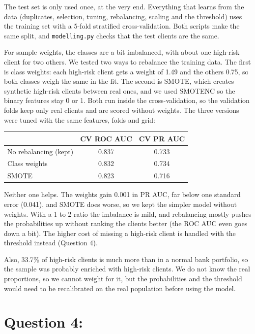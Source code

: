 \documentclass[12pt]{article}
\renewcommand{\_}{\textunderscore\allowbreak}
\begin{document}
The test set is only used once, at the very end. Everything that learns from the data (duplicates, selection, tuning, rebalancing, scaling and the threshold) uses the training set with a 5-fold stratified cross-validation. Both scripts make the same split, and \texttt{modelling.py} checks that the test clients are the same.

For sample weights, the classes are a bit imbalanced, with about one high-risk client for two others. We tested two ways to rebalance the training data. The first is class weights: each high-risk client gets a weight of 1.49 and the others 0.75, so both classes weigh the same in the fit. The second is SMOTE, which creates synthetic high-risk clients between real ones, and we used SMOTENC so the binary features stay 0 or 1. Both run inside the cross-validation, so the validation folds keep only real clients and are scored without weights. The three versions were tuned with the same features, folds and grid:

\begin{center}
\begin{tabular}{lcc}
    \hline
    & CV ROC AUC & CV PR AUC \\
    \hline
    No rebalancing (kept) & 0.837 & 0.733 \\
    Class weights & 0.832 & 0.734 \\
    SMOTE & 0.823 & 0.716 \\
    \hline
\end{tabular}
\end{center}

Neither one helps. The weights gain 0.001 in PR AUC, far below one standard error (0.041), and SMOTE does worse, so we kept the simpler model without weights. With a 1 to 2 ratio the imbalance is mild, and rebalancing mostly pushes the probabilities up without ranking the clients better (the ROC AUC even goes down a bit). The higher cost of missing a high-risk client is handled with the threshold instead (Question 4).

Also, 33.7\% of high-risk clients is much more than in a normal bank portfolio, so the sample was probably enriched with high-risk clients. We do not know the real proportions, so we cannot weight for it, but the probabilities and the threshold would need to be recalibrated on the real population before using the model.

\clearpage
\section*{Question 4:}
\end{document}
